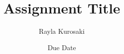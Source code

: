 \documentclass[12pt]{rayla_assignment}
\title{Assignment Title}
\author{Rayla Kurosaki}
\date{Due Date}
\begin{document}
    \maketitle
    \begin{problem}{1}{}
        \lipsum[1]
    \end{problem}
    \begin{solution}
        \lipsum[1-15]
    \end{solution}
\end{document}
